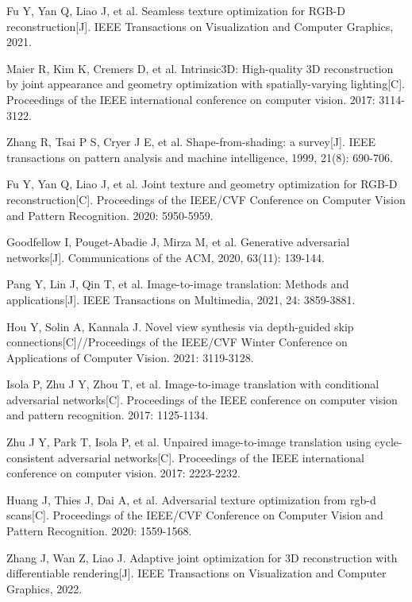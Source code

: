 Fu Y, Yan Q, Liao J, et al. Seamless texture optimization for RGB-D reconstruction[J]. IEEE Transactions on Visualization and Computer Graphics, 2021.

Maier R, Kim K, Cremers D, et al. Intrinsic3D: High-quality 3D reconstruction by joint appearance and geometry optimization with spatially-varying lighting[C]. Proceedings of the IEEE international conference on computer vision. 2017: 3114-3122. 

 Zhang R, Tsai P S, Cryer J E, et al. Shape-from-shading: a survey[J]. IEEE transactions on pattern analysis and machine intelligence, 1999, 21(8): 690-706.

Fu Y, Yan Q, Liao J, et al. Joint texture and geometry optimization for RGB-D reconstruction[C]. Proceedings of the IEEE/CVF Conference on Computer Vision and Pattern Recognition. 2020: 5950-5959.

Goodfellow I, Pouget-Abadie J, Mirza M, et al. Generative adversarial networks[J]. Communications of the ACM, 2020, 63(11): 139-144.

Pang Y, Lin J, Qin T, et al. Image-to-image translation: Methods and applications[J]. IEEE Transactions on Multimedia, 2021, 24: 3859-3881.

Hou Y, Solin A, Kannala J. Novel view synthesis via depth-guided skip connections[C]//Proceedings of the IEEE/CVF Winter Conference on Applications of Computer Vision. 2021: 3119-3128.

Isola P, Zhu J Y, Zhou T, et al. Image-to-image translation with conditional adversarial networks[C]. Proceedings of the IEEE conference on computer vision and pattern recognition. 2017: 1125-1134.

Zhu J Y, Park T, Isola P, et al. Unpaired image-to-image translation using cycle-consistent adversarial networks[C]. Proceedings of the IEEE international conference on computer vision. 2017: 2223-2232.

Huang J, Thies J, Dai A, et al. Adversarial texture optimization from rgb-d scans[C]. Proceedings of the IEEE/CVF Conference on Computer Vision and Pattern Recognition. 2020: 1559-1568.


Zhang J, Wan Z, Liao J. Adaptive joint optimization for 3D reconstruction with differentiable rendering[J]. IEEE Transactions on Visualization and Computer Graphics, 2022.


